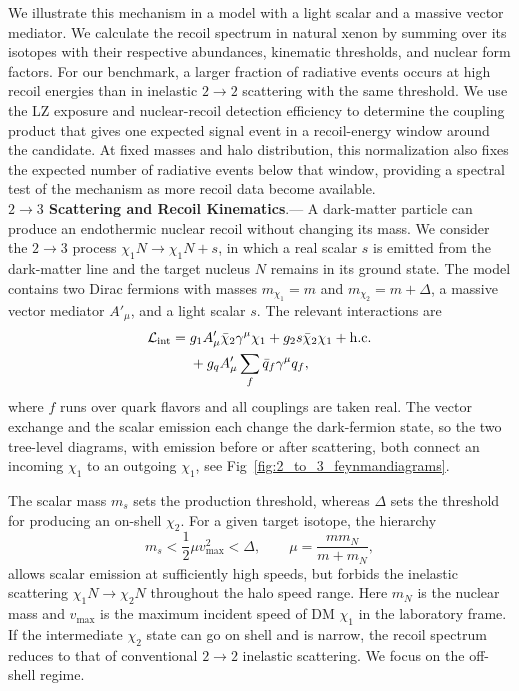 \documentclass[prd,showpacs,preprintnumbers,amsmath,amssymb,twocolumn,
superscriptaddress,notitlepage]{revtex4-2}
\begin{document}
We illustrate this mechanism in a model with a light scalar and a
massive vector mediator. We calculate the recoil spectrum in natural
xenon by summing over its isotopes with their respective abundances,
kinematic thresholds, and nuclear form factors. For our benchmark,
a larger fraction of radiative events occurs at high recoil energies
than in inelastic $2\to2$ scattering with the same threshold. We use
the LZ exposure and nuclear-recoil detection efficiency to determine
the coupling product that gives one expected signal event in a
recoil-energy window around the candidate. At fixed masses and halo
distribution, this normalization also fixes the expected number of
radiative events below that window, providing a spectral test of the
mechanism as more recoil data become available.
\\

\noindent \textbf{$2\to 3$ Scattering and Recoil Kinematics}.---
A dark-matter particle can produce an endothermic nuclear recoil
without changing its mass. We consider the $2\to 3$ process
$\chi_1 N\to\chi_1 N + s$, in which a real scalar $s$ is emitted
from the dark-matter line and the target nucleus $N$ remains in
its ground state. The model contains two Dirac fermions with
masses $m_{\chi_1}=m$ and $m_{\chi_2}=m+\Delta$, a massive
vector mediator $A'_\mu$, and a light scalar $s$. The relevant
interactions are
\begin{equation}
\begin{aligned}
\mathcal L_{\rm int}={}&
g_1 A'_\mu\bar\chi_2\gamma^\mu\chi_1
+g_2 s\bar\chi_2\chi_1+\mathrm{h.c.}\\
&+g_{q}A'_\mu\sum_f\bar q_f\gamma^\mu q_f ,
\end{aligned}
\label{eq:radiative-lagrangian}
\end{equation}
where $f$ runs over quark flavors and all couplings are taken
real. The vector exchange and the
scalar emission each change the dark-fermion state, so the two
tree-level diagrams, with emission before or after scattering,
both connect an incoming $\chi_1$ to an outgoing $\chi_1$, see Fig~\ref{fig:2_to_3_feynmandiagrams}.



The scalar mass $m_s$ sets the production threshold, whereas
$\Delta$ sets the threshold for producing an on-shell $\chi_2$.
For a given target isotope, the hierarchy
\begin{equation}
m_s<\frac12\mu v_{\max}^2<\Delta,
\qquad \mu=\frac{m m_N}{m+m_N},
\label{eq:radiative-offshell-window}
\end{equation}
allows scalar emission at sufficiently high speeds, but forbids
the inelastic scattering $\chi_1 N\to\chi_2 N$
throughout the halo speed range. 
Here $m_N$ is the nuclear mass and $v_{\max}$ is the
maximum incident speed of DM $\chi_1$ in the laboratory frame. 
If the intermediate $\chi_2$ state can go on shell and is narrow, 
the recoil spectrum reduces to that of conventional $2\to2$ inelastic scattering.
We focus on the off-shell regime.
\end{document}

